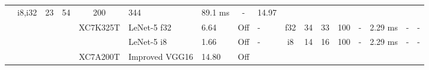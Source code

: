 \documentclass{article}
\begin{document}
\begin{table}
\begin{adjustbox}{totalheight=\baselineskip,}
\begin{tabular}{ccccclp{2em}cp{3em}cp{2em}p{4em}p{3em}p{3.5em}p{3.5em}p{2.5em}p{3em}}
                                   &\multirow{1}{*}{i8,i32}
                                       &\multirow{1}{*}{23}
                                           &\multirow{1}{*}{54}
                                               &\multirow{1}{*}{200}
                                                   &\multirow{1}{*}{344}
                                                       &\multirow{1}{*}{89.1 ms}
                                                           &\multirow{1}{*}{-}
                                                               &\multirow{1}{*}{14.97}\\
\cmidrule{4-17}
   &   &   &\multirow{2}{*}{\cite{weiFPGABasedHybridTypeImplementation2019}}
               &\multirow{2}{*}{XC7K325T}
                   &\multirow{1}{*}{LeNet-5 f32}
                       &\multirow{1}{*}{6.64}
                           &\multirow{1}{*}{Off}
                               &\multirow{1}{*}{-}
                                   &\multirow{1}{*}{f32}
                                       &\multirow{1}{*}{34}
                                           &\multirow{1}{*}{33}
                                               &\multirow{1}{*}{100}
                                                   &\multirow{1}{*}{-}
                                                       &\multirow{1}{*}{2.29 ms}
                                                           &\multirow{1}{*}{-}
                                                               &\multirow{1}{*}{-}\\
   &   &   &   &   &\multirow{1}{*}{LeNet-5 i8}
                       &\multirow{1}{*}{1.66}
                           &\multirow{1}{*}{Off}
                               &\multirow{1}{*}{-}
                                   &\multirow{1}{*}{i8}
                                       &\multirow{1}{*}{14}
                                           &\multirow{1}{*}{16}
                                               &\multirow{1}{*}{100}
                                                   &\multirow{1}{*}{-}
                                                       &\multirow{1}{*}{2.29 ms}
                                                           &\multirow{1}{*}{-}
                                                               &\multirow{1}{*}{-}\\
\cmidrule{4-17}
   &   &   &\multirow{2}{*}{\cite{yanAutomaticDeploymentConvolutional2022a}}
               &\multirow{2}{*}{XC7A200T}
                   &\multirow{1}{*}{Improved VGG16}
                       &\multirow{1}{*}{14.80}
                           &\multirow{1}{*}{Off}

\end{tabular}
\end{adjustbox}
\end{table}
\end{document}
